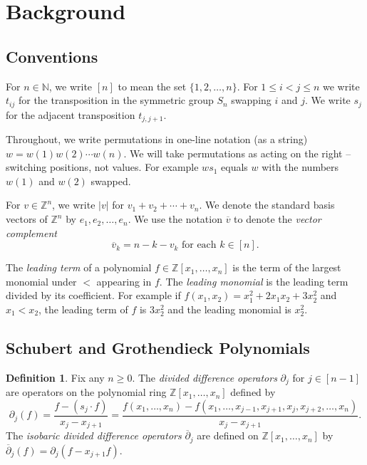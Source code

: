 \documentclass[11pt]{amsart}
\theoremstyle{definition}
\newtheorem{definition}[theorem]{Definition}
\theoremstyle{named}
\begin{document}
		 	
	\section{Background} 
	\label{sec:back}
	
	\subsection{Conventions}
	For $n\in \mathbb{N}$, we write $[n]$ to mean the set $\{1,2,\ldots,n \}$. For $1\leq i<j\leq n$ we write $t_{ij}$ for the transposition in the symmetric group $S_n$ swapping $i$ and $j$. We write $s_j$ for the adjacent transposition $t_{j,j+1}$.
	
	Throughout, we write permutations in one-line notation (as a string) $w=w(1)w(2)\cdots w(n)$. We will take permutations as acting on the right -- switching positions, not values. For example $ws_1$ equals $w$ with the numbers $w(1)$ and $w(2)$ swapped. 
	
	For $v\in \mathbb{Z}^n$, we write $|v|$ for $v_1+v_2+\cdots+v_n$. We denote the standard basis vectors of $\mathbb{Z}^n$ by $e_1,e_2,\ldots,e_n$. We use the notation $\overline{v}$ to denote the \emph{vector complement} 
	\[\overline{v}_k = n-k - v_k \mbox{ for each } k\in[n].\]
	
	The \emph{leading term} of a polynomial $f\in \mathbb{Z}[x_1,\ldots,x_n]$ is the term of the largest monomial under $<$ appearing in $f$. The \emph{leading monomial} is the leading term divided by its coefficient. For example if $f(x_1,x_2)=x_1^2+2x_1x_2+3x_2^2$ and $x_1<x_2$, the leading term of $f$ is $3x_2^2$ and the leading monomial is $x_2^2$.
	
	\subsection{Schubert and Grothendieck Polynomials}
	
	\begin{definition}
		Fix any $n\geq 0$. The \emph{divided difference operators} $\partial_j$ for $j\in[n-1]$ are operators on the polynomial ring $\mathbb{Z}[x_1,\ldots,x_n]$ defined by
		\[\partial_j(f)=\frac{f-(s_j\cdot f)}{x_j-x_{j+1}}
		=\frac{f(x_1,\ldots,x_n)-f(x_1,\ldots,x_{j-1},x_{j+1},x_j,x_{j+2},\ldots,x_n)}{x_j-x_{j+1}}.\]
		The \emph{isobaric divided difference operators} $\overline{\partial}_j$ are defined on $\mathbb{Z}[x_1,\ldots,x_n]$ by
		$\overline{\partial}_j(f)=\partial_j(f-x_{j+1}f)$.
	\end{definition}
	
\end{document}
